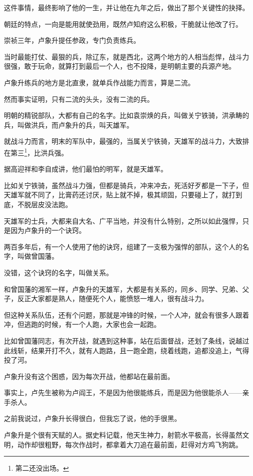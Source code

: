\begin{multicols}{\theparacolNo}
这件事情，最终影响了他的一生，并让他在九年之后，做出了那个关键性的抉择。

朝廷的特点，一向是能用就使劲用，既然卢知府这么积极，干脆就让他改了行。

崇祯三年，卢象升提任参政，专门负责练兵。

当时最能打仗、最狠的兵，除辽东，就是西北，这两个地方的人相当彪悍，战斗力很强，敢于玩命，就算打到最后一个人，也不投降，是明朝主要的兵源产地。

卢象升练兵的地方是北直隶，就单兵作战能力而言，算是二流。

然而事实证明，只有二流的头头，没有二流的兵。

明朝的精锐部队，大都有自己的名字。比如袁崇焕的兵，叫做关宁铁骑，洪承畴的兵，叫做洪兵，而卢象升的兵，叫天雄军。

就战斗力而言，明末的军队中，最强的，当属关宁铁骑，天雄军的战斗力，大致排在第三\footnote{第二还没出场。}，比洪兵强。

据高迎祥和李自成讲，他们最怕的明军，就是天雄军。

比如关宁铁骑，虽然战斗力强，但都是骑兵，冲来冲去，死活好歹都是一下子，但天雄军就不同了，比膏药还讨厌，贴上就不掉，极其顽固，只要碰上了，就打到底，不脱层皮没法跑。

天雄军的士兵，大都来自大名、广平当地，并没有什么特别，之所以如此强悍，只是因为卢象升的一个诀窍。

两百多年后，有一个人使用了他的诀窍，组建了一支极为强悍的部队，这个人的名字，叫做曾国藩。

没错，这个诀窍的名字，叫做关系。

和曾国藩的湘军一样，卢象升的天雄军，大都是有关系的，同乡、同学、兄弟、父子，反正大家都是熟人，随便死个人，能愤怒一堆人，很有战斗力。

但这种关系队伍，还有个问题，那就是冲锋的时候，一个人冲，就会有很多人跟着冲，但逃跑的时候，有一个人跑，大家也会一起跑。

比如曾国藩同志，有次开战，就遇到这种事，站在后面督战，还划了条线，说越过此线斩，结果开打不久，就有人跑路，且一跑全跑，绕着线跑，追都没追上，气得投了河。

卢象升没有这个困惑，因为每次开战，他都站在最前面。

事实上，卢先生被称为卢阎王，不是因为他很能练兵，而是因为他很能杀人——亲手杀人。

之前我说过，卢象升长得很白，但我忘了说，他的手很黑。

卢象升是个很有天赋的人。据史料记载，他天生神力，射箭水平极高，长得虽然文明，动作却很粗野，每次作战时，都拿着大刀追在最前面，赶得对方鸡飞狗跳。


\end{multicols}
